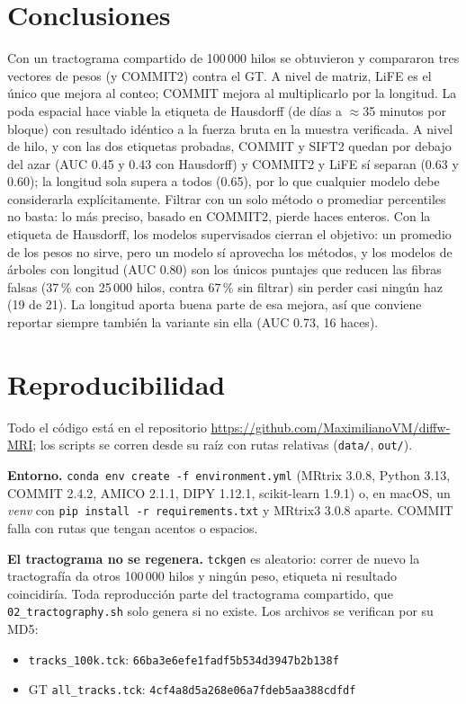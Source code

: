 \documentclass[11pt,a4paper]{article}
\newcommand{\code}[1]{\texttt{\small #1}}
\begin{document}
\section{Conclusiones}

Con un tractograma compartido de 100\,000 hilos se obtuvieron y compararon tres vectores de
pesos (y COMMIT2) contra el GT. A nivel de matriz, LiFE es el \'unico que mejora al conteo;
COMMIT mejora al multiplicarlo por la longitud. La poda espacial hace viable la etiqueta de
Hausdorff (de d\'ias a $\approx$35 minutos por bloque) con resultado id\'entico a la fuerza
bruta en la muestra verificada. A nivel de hilo, y con las dos etiquetas probadas, COMMIT y
SIFT2 quedan por debajo del azar (AUC 0.45 y 0.43 con Hausdorff) y COMMIT2 y LiFE s\'i
separan (0.63 y 0.60); la longitud sola supera a todos (0.65), por lo que cualquier modelo
debe considerarla expl\'icitamente. Filtrar con un solo m\'etodo o promediar percentiles no
basta: lo m\'as preciso, basado en COMMIT2, pierde haces enteros. Con la etiqueta de Hausdorff, los
modelos supervisados cierran el objetivo: un promedio de los pesos no sirve, pero un modelo
s\'i aprovecha los m\'etodos, y los modelos de \'arboles con longitud (AUC 0.80) son los
\'unicos puntajes que reducen las fibras falsas (37\,\% con 25\,000 hilos, contra 67\,\% sin
filtrar) sin perder casi ning\'un haz (19 de 21). La longitud aporta buena parte de esa
mejora, as\'i que conviene reportar siempre tambi\'en la variante sin ella (AUC 0.73, 16
haces).

\appendix
\section{Reproducibilidad}
\label{app:repro}

Todo el c\'odigo est\'a en el repositorio \url{https://github.com/MaximilianoVM/diffw-MRI};
los scripts se corren desde su ra\'iz con rutas relativas (\code{data/}, \code{out/}).

{\sloppy
\textbf{Entorno.} \code{conda env create -f environment.yml} (MRtrix 3.0.8, Python 3.13,
COMMIT 2.4.2, AMICO 2.1.1, DIPY 1.12.1, scikit-learn 1.9.1) o, en macOS, un
\textit{venv} con \code{pip install -r requirements.txt} y MRtrix3 3.0.8 aparte. COMMIT falla con rutas
que tengan acentos o espacios.\par}

\textbf{El tractograma no se regenera.} \code{tckgen} es aleatorio: correr de nuevo la
tractograf\'ia da otros 100\,000 hilos y ning\'un peso, etiqueta ni resultado coincidir\'ia.
Toda reproducci\'on parte del tractograma compartido, que \code{02\_tractography.sh} solo
genera si no existe. Los archivos se verifican por su MD5:
\begin{itemize}
  \item \code{tracks\_100k.tck}: \texttt{66ba3e6efe1fadf5b534d3947b2b138f}
  \item GT \code{all\_tracks.tck}: \texttt{4cf4a8d5a268e06a7fdeb5aa388cdfdf}
\end{itemize}
\end{document}
